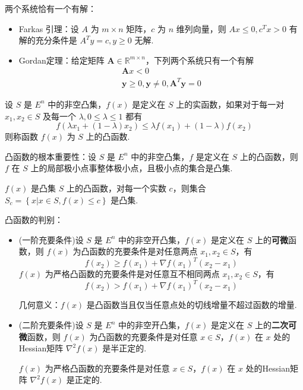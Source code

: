 \begin{remark}
    两个系统恰有一个有解：
    \begin{itemize}
        \item Farkas 引理：设 $A$ 为 $m\times n$ 矩阵，$c$ 为 $n$ 维列向量，则 $Ax \le 0, c^Tx > 0$ 有解的充分条件是 $A^Ty = c, y\ge 0$ 无解.
        \item Gordan定理：给定矩阵 $\boldsymbol{A} \in \mathbb{R}^{m\times n}$，下列两个系统只有一个有解
        \begin{gather*}
            \boldsymbol{A}x < 0\\
            \boldsymbol{y} \ge 0, \boldsymbol{y} \neq 0, \boldsymbol{A}^T\boldsymbol{y} = 0
        \end{gather*}
    \end{itemize}
\end{remark}

\begin{remark}
    设 $S$ 是 $E^n$ 中的非空凸集，$f(x)$ 是定义在 $S$ 上的实函数，如果对于每一对 $x_1, x_2 \in S$ 及每一个 $\lambda, 0\le \lambda \le 1$ 都有 \[f(\lambda x_1 + (1 - \lambda)x_2) \le \lambda f(x_1) + (1 - \lambda)f(x_2)\]
    则称函数 $f(x)$ 为 $S$ 上的凸函数.

    凸函数的根本重要性：设 $S$ 是 $E^n$ 中的非空凸集，$f$ 是定义在 $S$ 上的凸函数，则 $f$ 在 $S$ 上的局部极小点事整体极小点，且极小点的集合是凸集.
\end{remark}

\begin{remark}
    $f(x)$ 是凸集 $S$ 上的凸函数，对每一个实数 $c$，则集合 $S_c = \left\{x | x \in S, f(x) \le c\right\}$ 是凸集.
\end{remark}

\begin{remark}
    凸函数的判别：
    \begin{itemize}
        \item (一阶充要条件)设 $S$ 是 $E^n$ 中的非空开凸集，$f(x)$ 是定义在 $S$ 上的\textbf{可微}函数，则 $f(x)$ 为凸函数的充要条件是对任意两点 $x_1, x_2 \in S$，有 \[f(x_2) \ge f(x_1) + \nabla f(x_1)^T(x_2 - x_1)\]
        $f(x)$ 为严格凸函数的充要条件是对任意互不相同两点 $x_1, x_2 \in S$，有 \[f(x_2) > f(x_1) + \nabla f(x_1)^T(x_2 - x_1)\]

        几何意义：$f(x)$ 是凸函数当且仅当任意点处的切线增量不超过函数的增量.
        \item (二阶充要条件)设 $S$ 是 $E^n$ 中的非空开凸集，$f(x)$ 是定义在 $S$ 上的\textbf{二次可微}函数，则 $f(x)$ 为凸函数的充要条件是对任意 $x \in S$，$f(x)$ 在 $x$ 处的Hessian矩阵 $\nabla ^2f(x)$ 是半正定的.
        
        $f(x)$ 为严格凸函数的充要条件是对任意 $x \in S$，$f(x)$ 在 $x$ 处的Hessian矩阵 $\nabla ^2f(x)$ 是正定的.
    \end{itemize}
\end{remark}


